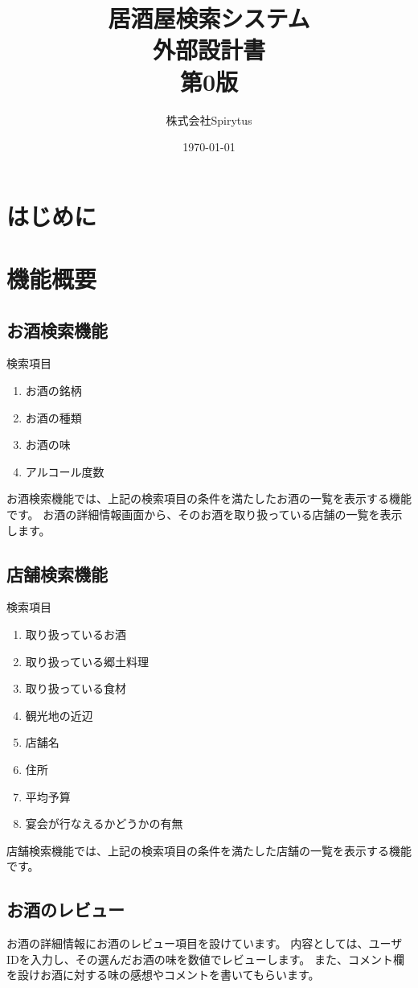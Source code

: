 \documentclass[a4j,titlepage]{jarticle}
\title{居酒屋検索システム\\
外部設計書\\
第0版}
\author{株式会社Spirytus}
\date{\today}
\begin{document}
\maketitle
\tableofcontents

\section{はじめに}

\section{機能概要}
\subsection{お酒検索機能}
検索項目
\begin{enumerate}
\item お酒の銘柄
\item お酒の種類
\item お酒の味
\item アルコール度数
\end{enumerate}
お酒検索機能では、上記の検索項目の条件を満たしたお酒の一覧を表示する機能です。
お酒の詳細情報画面から、そのお酒を取り扱っている店舗の一覧を表示します。

\subsection{店舗検索機能}
検索項目
\begin{enumerate}
\item 取り扱っているお酒
\item 取り扱っている郷土料理
\item 取り扱っている食材
\item 観光地の近辺
\item 店舗名
\item 住所
\item 平均予算
\item 宴会が行なえるかどうかの有無
\end{enumerate}
店舗検索機能では、上記の検索項目の条件を満たした店舗の一覧を表示する機能です。

\subsection{お酒のレビュー}
お酒の詳細情報にお酒のレビュー項目を設けています。
内容としては、ユーザIDを入力し、その選んだお酒の味を数値でレビューします。
また、コメント欄を設けお酒に対する味の感想やコメントを書いてもらいます。
\end{document}
